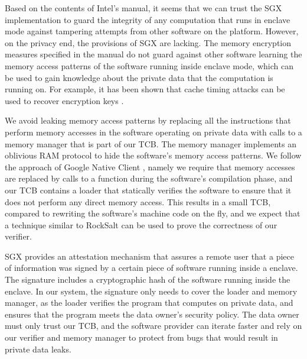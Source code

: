 Based on the contents of Intel's manual, it seems that we can trust the SGX
implementation to guard the integrity of any computation that runs in enclave
mode against tampering attempts from other software on the platform. However,
on the privacy end, the provisions of SGX are lacking. The memory encryption
measures specified in the manual do not guard against other software learning
the memory access patterns of the software running inside enclave mode, which
can be used to gain knowledge about the private data that the computation is
running on. For example, it has been shown that cache timing attacks can be
used to recover encryption keys \cite{bonneau2006cache}
\cite{brumley2005remote} \cite{kocher1996timing}.

We avoid leaking memory access patterns by replacing all the instructions that
perform memory accesses in the software operating on private data with calls
to a memory manager that is part of our TCB. The memory manager implements an
oblivious RAM protocol \cite{stefanov2012path} to hide the software's memory
access patterns. We follow the approach of Google Native Client
\cite{yee2009native} \cite{sehr2010adapting}, namely we require that memory
accesses are replaced by calls to a function during the software's compilation
phase, and our TCB contains a loader that statically verifies the software to
ensure that it does not perform any direct memory access. This results in a
small TCB, compared to rewriting the software's machine code on the fly, and
we expect that a technique similar to RockSalt \cite{morrisett2012rocksalt} can
be used to prove the correctness of our verifier.

SGX provides an attestation mechanism that assures a remote user that a piece
of information was signed by a certain piece of software running inside a
enclave. The signature includes a cryptographic hash of the software running
inside the enclave. In our system, the signature only needs to cover the loader
and memory manager, as the loader verifies the program that computes on
private data, and ensures that the program meets the data owner's security
policy. The data owner must only trust our TCB, and the software provider can
iterate faster and rely on our verifier and memory manager to protect from
bugs that would result in private data leaks.


